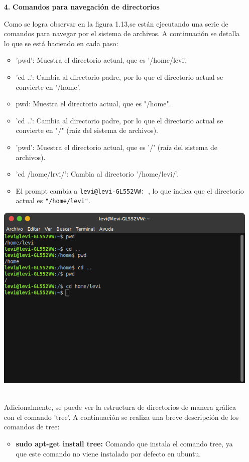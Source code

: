\documentclass[11pt,twoside]{book}
\begin{document}
\begin{enumerate}
  \item[\textbf{4.}] \textbf{Comandos para navegación de directorios} 


    Como se logra observar en la figura 1.13,se están ejecutando una serie de comandos para navegar por el sistema de archivos. A continuación se detalla lo que se está haciendo en cada paso:
  \begin{itemize}
      \item 'pwd': Muestra el directorio actual, que es '/home/levi'.
      \item 'cd ..': Cambia al directorio padre, por lo que el directorio actual se convierte en '/home'.
      \item pwd: Muestra el directorio actual, que es "/home".
      \item 'cd ..': Cambia al directorio padre, por lo que el directorio actual se convierte en "/" (raíz del sistema de archivos).
      \item 'pwd': Muestra el directorio actual, que es '/' (raíz del sistema de archivos).
      \item 'cd /home/lrvi/': Cambia al directorio '/home/levi/'.
      \item El prompt cambia a \texttt{levi@levi-GL552VW: \textdollar}, lo que indica que el directorio actual es \texttt{"/home/levi"}.
  \end{itemize}
        \begin{minipage}{\linewidth}
        \centering
        \includegraphics[width=0.6\linewidth]{directorios.png}
        \label{fig:etiqueta}
    \end{minipage}\\
  Adicionalmente, se puede ver la estructura de directorios de manera gráfica con el comando 'tree'. A continuación se realiza una breve descripción de los comandos de tree:
  \begin{itemize}
      \item\textbf{sudo apt-get install tree: } Comando que instala el comando tree, ya que este comando no viene instalado por defecto en ubuntu.

\end{itemize}
\end{enumerate}
\end{document}
